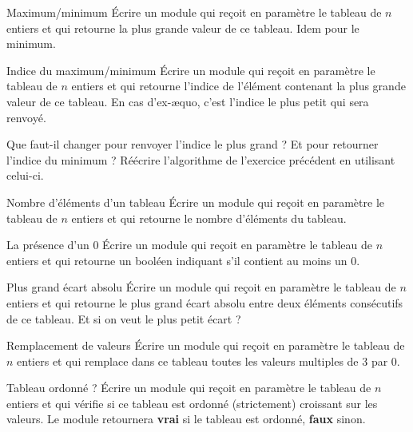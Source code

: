 \begin{Exercice}{Maximum/minimum}
	Écrire un module qui reçoit en paramètre le tableau
	 de $n$ entiers et qui
	retourne la plus grande valeur de ce tableau. Idem pour le minimum.
\end{Exercice}

\begin{Exercice}{Indice du maximum/minimum}
	\label{ex:indiceminmax}
	Écrire un module qui reçoit en paramètre le tableau
	 de $n$ entiers et qui
	retourne l’indice de l’élément contenant la plus grande valeur de ce
	tableau. 
	En cas d’ex-æquo, c’est l’indice le plus petit qui sera renvoyé.
	
	Que faut-il changer pour renvoyer l’indice le plus grand ?
	Et pour retourner l’indice du minimum ? 
	Réécrire l’algorithme de l’exercice précédent en utilisant celui-ci.
\end{Exercice}

\begin{Exercice}{Nombre d'éléments d'un tableau}
	Écrire un module qui reçoit en paramètre le tableau
	 de $n$ entiers et qui
	retourne le nombre d’éléments du tableau.
\end{Exercice}

\begin{Exercice}{La présence d'un 0}
	Écrire un module qui reçoit en paramètre le tableau
	 de $n$ entiers 
	et qui retourne un booléen 
	indiquant s'il contient au moins un 0. 
\end{Exercice}

\begin{Exercice}{Plus grand écart absolu}
	Écrire un module qui reçoit en paramètre le tableau
	 de $n$ entiers et qui
	retourne le plus grand écart absolu entre deux éléments consécutifs de
	ce tableau.
	Et si on veut le plus petit écart ?
\end{Exercice}

\begin{Exercice}{Remplacement de valeurs}
	Écrire un module qui reçoit en paramètre le tableau
	 de $n$ entiers et qui
	remplace dans ce tableau toutes les valeurs multiples de 3 par 0.
\end{Exercice}

\begin{Exercice}{Tableau ordonné ?}
	Écrire un module qui reçoit en paramètre le tableau
	 de $n$ entiers et qui
	vérifie si ce tableau est ordonné (strictement) croissant sur les
	valeurs. Le module retournera \textbf{vrai} si le tableau est ordonné,
	\textbf{faux} sinon.
\end{Exercice}

